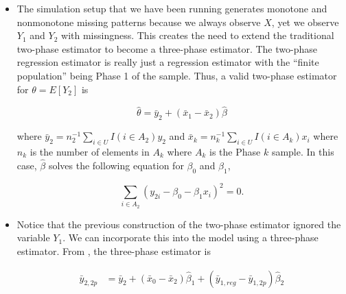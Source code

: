 \begin{itemize}
  \item The simulation setup that we have been running generates monotone and
    nonmonotone missing patterns because we always observe $X$, yet we observe
    $Y_1$ and $Y_2$ with missingness. This creates the need to extend the
    traditional two-phase estimator to become a three-phase estimator. The
    two-phase regression estimator is really just a regression estimator with
    the ``finite population'' being Phase 1 of the sample. Thus, a valid
    two-phase estimator for $\theta = E[Y_2]$ is

    \[\hat \theta = \bar y_2 + (\bar x_1 - \bar x_2) \hat \beta\]

    where $\bar y_2 = n_2^{-1} \sum_{i \in U} I(i \in A_2) y_2$ and $\bar x_k =
    n_k^{-1} \sum_{i \in U} I(i \in A_k) x_i$ where $n_k$ is the number of
    elements in $A_k$ where $A_k$ is the Phase $k$ sample. In this case, $\hat
    \beta$ solves the following equation for $\beta_0$ and $\beta_1$,

    \[\sum_{i \in A_2} (y_{2i} - \beta_0 - \beta_1 x_i)^2 = 0.\]

  \item Notice that the previous construction of the two-phase estimator ignored
    the variable $Y_1$. We can incorporate this into the model using a 
    three-phase estimator. From \cite{fuller2009sampling}, the three-phase
    estimator is 

    \begin{align*}
      \bar y_{2, 2p} &= \bar y_2 + (\bar x_0 - \bar x_{2}) \hat \beta_1 + 
      (\bar y_{1, reg} - \bar y_{1, 2p}) \hat \beta_2
    \end{align*}


\end{itemize}
